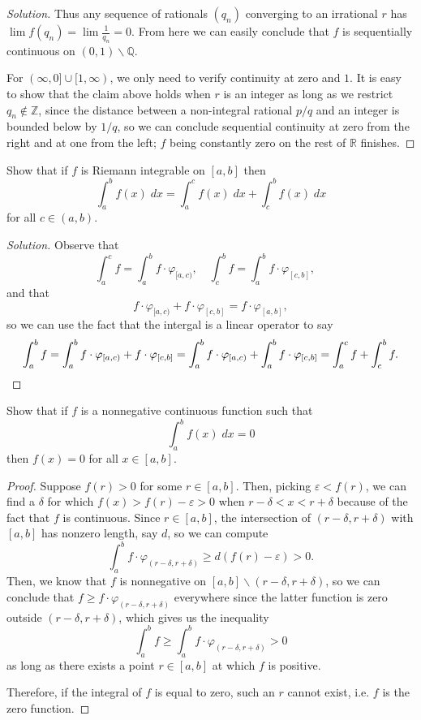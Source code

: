 \documentclass[11pt]{scrartcl}
\providecommand{\eps}{\varepsilon}
\providecommand{\QQ}{\mathbb Q}
\providecommand{\RR}{\mathbb R}
\providecommand{\ZZ}{\mathbb Z}
\providecommand{\setdiff}{\smallsetminus}
\providecommand{\dif}{\;d}
\newenvironment{soln}{\begin{proof}[Solution]}{\end{proof}}
\begin{document}
\begin{soln}
	Thus any sequence of rationals $(q_n)$ converging to an irrational $r$ has
	$\lim f(q_n) = \lim \frac1{q_n} = 0$.
	From here we can easily conclude that $f$ is sequentially continuous
	on $(0,1)\setdiff\QQ$.
	
	For $(\infty, 0]\cup[1,\infty)$, we only need to verify continuity
	at zero and $1$. It is easy to show that the claim above holds
	when $r$ is an integer as long as we restrict $q_n\notin\ZZ$,
	since the distance between a non-integral rational $p/q$ and an integer
	is bounded below by $1/q$, so we can conclude sequential continuity
	at zero from the right and at one from the left;
	$f$ being constantly zero on the rest of $\RR$ finishes.
\end{soln}

\setcounter{problem}{6}

\begin{problem}
	Show that if $f$ is Riemann integrable on $[a,b]$ then
	\[\int_a^b f(x)\dif x = \int_a^c f(x)\dif x + \int_c^b f(x)\dif x\]
	for all $c\in(a,b)$.
\end{problem}

\begin{soln}
	Observe that
	\[\int_a^c f = \int_a^b f\cdot\varphi_{[a,c)},\quad
	\int_c^b f = \int_a^b f\cdot\varphi_{[c,b]},\quad\]
	and that
	\[f\cdot\varphi_{[a,c)} + f\cdot\varphi_{[c,b]} = f\cdot\varphi_{[a,b]},\]
	so we can use the fact that the intergal is a linear operator to say
	\[\int_a^b f = \int_a^b f\cdot\varphi_{[a,c)} + f\cdot\varphi_{[c,b]}
	= \int_a^b f\cdot\varphi_{[a,c)} + \int_a^b f\cdot\varphi_{[c,b]}
	= \int_a^c f + \int_c^b f.\qedhere\]
\end{soln}

\begin{problem}
	Show that if $f$ is a nonnegative continuous function such that
	\[\int_a^b f(x)\dif x = 0\]
	then $f(x) = 0$ for all $x\in[a,b]$.
\end{problem}

\begin{proof}
	Suppose $f(r) > 0$ for some $r\in[a,b]$.
	Then, picking $\eps < f(r)$, we can find a $\delta$ for which
	$f(x) > f(r) - \eps > 0$ when $r - \delta < x < r + \delta$
	because of the fact that $f$ is continuous.
	Since $r\in[a,b]$, the intersection of $(r-\delta,r+\delta)$
	with $[a,b]$ has nonzero length, say $d$, so we can compute
	\[\int_a^b f\cdot \varphi_{(r-\delta,r+\delta)}
	\ge d(f(r) - \eps) > 0.\]
	Then, we know that $f$ is nonnegative on $[a,b]\setdiff(r-\delta,r+\delta)$,
	so we can conclude that $f \ge f\cdot \varphi_{(r-\delta,r+\delta)}$
	everywhere since the latter function is zero outside $(r-\delta,r+\delta)$,
	which gives us the inequality
	\[\int_a^b f \ge \int_a^b f\cdot \varphi_{(r-\delta,r+\delta)} > 0\]
	as long as there exists a point $r\in[a,b]$ at which $f$ is positive.
	
	Therefore, if the integral of $f$ is equal to zero,
	such an $r$ cannot exist, i.e. $f$ is the zero function.
\end{proof}
\end{document}

